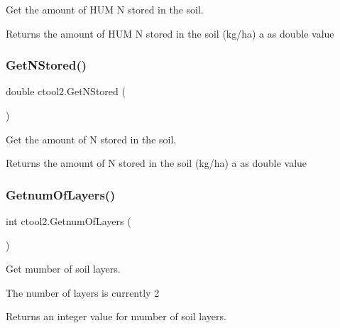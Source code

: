 Get the amount of H\+UM N stored in the soil. 

\begin{DoxyReturn}{Returns}
the amount of H\+UM N stored in the soil (kg/ha) a as double value 
\end{DoxyReturn}
\mbox{\label{classctool2_a17a35e9c9faa7486c87fea08796c64de}} 
\subsubsection{\texorpdfstring{GetNStored()}{GetNStored()}}
{\footnotesize\ttfamily double ctool2.\+Get\+N\+Stored (\begin{DoxyParamCaption}{ }\end{DoxyParamCaption})\hspace{0.3cm}{\ttfamily [inline]}}



Get the amount of N stored in the soil. 

\begin{DoxyReturn}{Returns}
the amount of N stored in the soil (kg/ha) a as double value 
\end{DoxyReturn}
\mbox{\label{classctool2_ab86d9eac33a5b0e729a9c08e62ce2cac}} 
\subsubsection{\texorpdfstring{GetnumOfLayers()}{GetnumOfLayers()}}
{\footnotesize\ttfamily int ctool2.\+Getnum\+Of\+Layers (\begin{DoxyParamCaption}{ }\end{DoxyParamCaption})\hspace{0.3cm}{\ttfamily [inline]}}



Get mumber of soil layers. 

The number of layers is currently 2 \begin{DoxyReturn}{Returns}
an integer value for mumber of soil layers. 
\end{DoxyReturn}
\mbox{\label{classctool2_a4fe5c0ef250c6b583869ea8f3a9bfaca}} 
